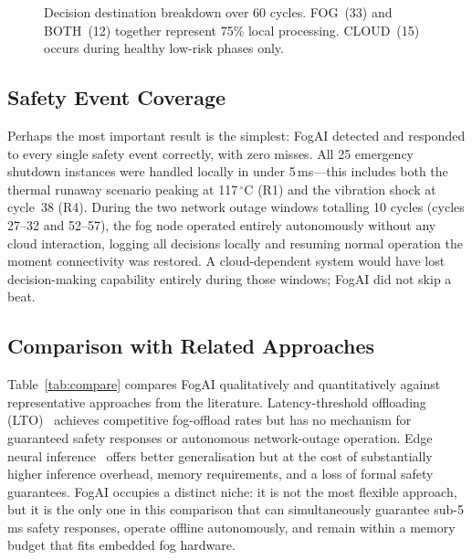 \documentclass[conference]{IEEEtran}
\begin{document}
\begin{figure}[t]
\centering
{}
\caption{Decision destination breakdown over 60 cycles. FOG~(33)
and BOTH~(12) together represent 75\% local processing. CLOUD~(15)
occurs during healthy low-risk phases only.}
\label{fig:routing}
\end{figure}

\subsection{Safety Event Coverage}

Perhaps the most important result is the simplest: FogAI detected and
responded to every single safety event correctly, with zero misses.
All 25 emergency shutdown instances were handled locally in under
5\,ms---this includes both the thermal runaway scenario peaking at
117\,$^\circ$C (R1) and the vibration shock at cycle~38 (R4).
During the two network outage windows totalling 10 cycles
(cycles 27--32 and 52--57), the fog node operated entirely
autonomously without any cloud interaction, logging all decisions
locally and resuming normal operation the moment connectivity
was restored.
A cloud-dependent system would have lost decision-making capability
entirely during those windows; FogAI did not skip a beat.

\subsection{Comparison with Related Approaches}

Table~\ref{tab:compare} compares FogAI qualitatively and quantitatively
against representative approaches from the literature.
Latency-threshold offloading (LTO)~\cite{mahmud2018fog} achieves
competitive fog-offload rates but has no mechanism for guaranteed
safety responses or autonomous network-outage operation.
Edge neural inference~\cite{liu2019edge,cao2020edge} offers better
generalisation but at the cost of substantially higher inference
overhead, memory requirements, and a loss of formal safety guarantees.
FogAI occupies a distinct niche: it is not the most flexible approach,
but it is the only one in this comparison that can simultaneously
guarantee sub-5\,ms safety responses, operate offline autonomously,
and remain within a memory budget that fits embedded fog hardware.
\end{document}
